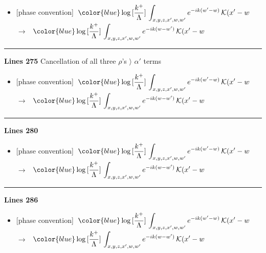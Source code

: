 \documentclass[10pt]{article}
\begin{document}
\begin{itemize}[leftmargin=2.2em,itemsep=1pt,topsep=2pt]
\item[\textbf{l.268}] \textsf{\small [phase convention]} $\displaystyle \,{\color{blue}\log{[\frac{k^{+}}{\Lambda}]}}\,\int_{x,y,z,x',w,w'}e^{-ik(w'-w)}\,\mathcal{K}(x'-w$\ $\longrightarrow$\ $\displaystyle \,{\color{blue}\log{[\frac{k^{+}}{\Lambda}]}}\,\int_{x,y,z,x',w,w'}e^{-ik(w-w')}\,\mathcal{K}(x'-w$
\end{itemize}
\noindent\rule{\linewidth}{0.3pt}\par\noindent\textbf{Lines 275} \quad \textsf{Cancellation of all three $\rho$'s $\rangle$ $\alpha'$ terms} \par
\begin{itemize}[leftmargin=2.2em,itemsep=1pt,topsep=2pt]
\item[\textbf{l.275}] \textsf{\small [phase convention]} $\displaystyle \,{\color{blue}\log{[\frac{k^{+}}{\Lambda}]}}\,\int_{x,y,z,x',w,w'}e^{-ik(w'-w)}\,\mathcal{K}(x'-w$\ $\longrightarrow$\ $\displaystyle \,{\color{blue}\log{[\frac{k^{+}}{\Lambda}]}}\,\int_{x,y,z,x',w,w'}e^{-ik(w-w')}\,\mathcal{K}(x'-w$
\end{itemize}
\noindent\rule{\linewidth}{0.3pt}\par\noindent\textbf{Lines 280} \par
\begin{itemize}[leftmargin=2.2em,itemsep=1pt,topsep=2pt]
\item[\textbf{l.280}] \textsf{\small [phase convention]} $\displaystyle \,{\color{blue}\log{[\frac{k^{+}}{\Lambda}]}}\,\int_{x,y,z,x',w,w'}e^{-ik(w'-w)}\,\mathcal{K}(x'-w$\ $\longrightarrow$\ $\displaystyle \,{\color{blue}\log{[\frac{k^{+}}{\Lambda}]}}\,\int_{x,y,z,x',w,w'}e^{-ik(w-w')}\,\mathcal{K}(x'-w$
\end{itemize}
\noindent\rule{\linewidth}{0.3pt}\par\noindent\textbf{Lines 286} \par
\begin{itemize}[leftmargin=2.2em,itemsep=1pt,topsep=2pt]
\item[\textbf{l.286}] \textsf{\small [phase convention]} $\displaystyle \,{\color{blue}\log{[\frac{k^{+}}{\Lambda}]}}\,\int_{x,y,z,x',w,w'}e^{-ik(w'-w)}\,\mathcal{K}(x'-w$\ $\longrightarrow$\ $\displaystyle \,{\color{blue}\log{[\frac{k^{+}}{\Lambda}]}}\,\int_{x,y,z,x',w,w'}e^{-ik(w-w')}\,\mathcal{K}(x'-w$
\end{itemize}
\end{document}
